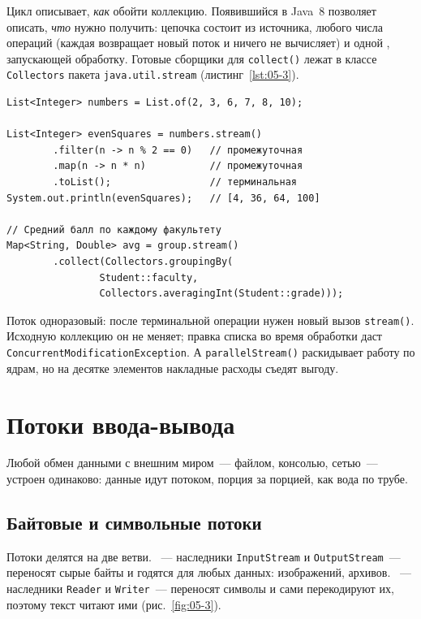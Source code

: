 Цикл описывает, \emph{как} обойти коллекцию. Появившийся в Java~8
 позволяет описать, \emph{что} нужно получить: цепочка состоит
из источника, любого числа  операций (каждая возвращает новый
поток и ничего не вычисляет) и одной , запускающей обработку.
Готовые сборщики для \texttt{collect()} лежат в классе \texttt{Collectors}
пакета \texttt{java.util.stream} (листинг~\ref{lst:05-3}).

\begin{listing}[H]
\begin{verbatim}
List<Integer> numbers = List.of(2, 3, 6, 7, 8, 10);

List<Integer> evenSquares = numbers.stream()
        .filter(n -> n % 2 == 0)   // промежуточная
        .map(n -> n * n)           // промежуточная
        .toList();                 // терминальная
System.out.println(evenSquares);   // [4, 36, 64, 100]

// Средний балл по каждому факультету
Map<String, Double> avg = group.stream()
        .collect(Collectors.groupingBy(
                Student::faculty,
                Collectors.averagingInt(Student::grade)));
\end{verbatim}
\caption{Фильтрация, преобразование и группировка}
\label{lst:05-3}
\end{listing}

Поток одноразовый: после терминальной операции нужен новый вызов
\texttt{stream()}. Исходную коллекцию он не меняет; правка списка во время
обработки даст \texttt{ConcurrentModificationException}. А
\texttt{parallelStream()} раскидывает работу по ядрам, но на десятке элементов
накладные расходы съедят выгоду.

\section{Потоки ввода-вывода}

Любой обмен данными с внешним миром~--- файлом, консолью, сетью~--- устроен
одинаково: данные идут потоком, порция за порцией, как вода по трубе.

\subsection{Байтовые и символьные потоки}

Потоки делятся на две ветви. ~--- наследники
\texttt{InputStream} и \texttt{OutputStream}~--- переносят сырые байты и годятся
для любых данных: изображений, архивов. ~--- наследники
\texttt{Reader} и \texttt{Writer}~--- переносят символы и сами перекодируют их,
поэтому текст читают ими (рис.~\ref{fig:05-3}).

